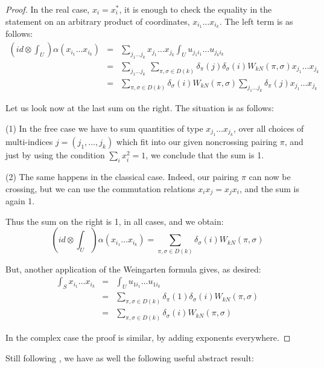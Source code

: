\documentclass[12pt]{amsbook}
\begin{document}
\begin{proof}
In the real case, $x_i=x_i^*$, it is enough to check the equality in the statement on an arbitrary product of coordinates, $x_{i_1}\ldots x_{i_k}$. The left term is as follows:
\begin{eqnarray*}
\left(id\otimes\int_U\right)\alpha(x_{i_1}\ldots x_{i_k})
&=&\sum_{j_1\ldots j_k}x_{j_1}\ldots x_{j_k}\int_Uu_{j_1i_1}\ldots u_{j_ki_k}\\
&=&\sum_{j_1\ldots j_k}\ \sum_{\pi,\sigma\in D(k)}\delta_\pi(j)\delta_\sigma(i)W_{kN}(\pi,\sigma)x_{j_1}\ldots x_{j_k}\\
&=&\sum_{\pi,\sigma\in D(k)}\delta_\sigma(i)W_{kN}(\pi,\sigma)\sum_{j_1\ldots j_k}\delta_\pi(j)x_{j_1}\ldots x_{j_k}
\end{eqnarray*}

Let us look now at the last sum on the right. The situation is as follows:

\medskip

(1) In the free case we have to sum quantities of type $x_{j_1}\ldots x_{j_k}$, over all choices of multi-indices $j=(j_1,\ldots,j_k)$ which fit into our given noncrossing pairing $\pi$, and just by using the condition $\sum_ix_i^2=1$, we conclude that the sum is 1. 

\medskip

(2) The same happens in the classical case. Indeed, our pairing $\pi$ can now be crossing, but we can use the commutation relations $x_ix_j=x_jx_i$, and the sum is again 1.

\medskip

Thus the sum on the right is 1, in all cases, and we obtain:
$$\left(id\otimes\int_U\right)\alpha(x_{i_1}\ldots x_{i_k})
=\sum_{\pi,\sigma\in D(k)}\delta_\sigma(i)W_{kN}(\pi,\sigma)$$

But, another application of the Weingarten formula gives, as desired:
\begin{eqnarray*}
\int_Sx_{i_1}\ldots x_{i_k}
&=&\int_Uu_{1i_1}\ldots u_{1i_k}\\
&=&\sum_{\pi,\sigma\in D(k)}\delta_\pi(1)\delta_\sigma(i)W_{kN}(\pi,\sigma)\\
&=&\sum_{\pi,\sigma\in D(k)}\delta_\sigma(i)W_{kN}(\pi,\sigma)
\end{eqnarray*}

In the complex case the proof is similar, by adding exponents everywhere.
\end{proof} 

Still following \cite{bgo}, we have as well the following useful abstract result:
\end{document}
